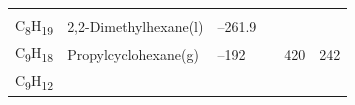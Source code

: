 \documentclass[
  9pt,
]{extbook}
\theoremstyle{definition}
\theoremstyle{definition}
\theoremstyle{definition}
\theoremstyle{remark}
\begin{document}
\begin{longtable}[]{@{}llllll@{}}
\begin{minipage}[t]{0.15\columnwidth}
\strut
\end{minipage} & \begin{minipage}[t]{0.14\columnwidth}\raggedright
\strut
\end{minipage} & \begin{minipage}[t]{0.14\columnwidth}\raggedright
\strut
\end{minipage}\tabularnewline
\begin{minipage}[t]{0.07\columnwidth}\raggedright
C\textsubscript{8}H\textsubscript{19}\strut
\end{minipage} & \begin{minipage}[t]{0.17\columnwidth}\raggedright
2,2-Dimethylhexane(l)\strut
\end{minipage} & \begin{minipage}[t]{0.15\columnwidth}\raggedright
--261.9\strut
\end{minipage} & \begin{minipage}[t]{0.15\columnwidth}\raggedright
\strut
\end{minipage} & \begin{minipage}[t]{0.14\columnwidth}\raggedright
\strut
\end{minipage} & \begin{minipage}[t]{0.14\columnwidth}\raggedright
\strut
\end{minipage}\tabularnewline
\begin{minipage}[t]{0.07\columnwidth}\raggedright
C\textsubscript{9}H\textsubscript{18}\strut
\end{minipage} & \begin{minipage}[t]{0.17\columnwidth}\raggedright
Propylcyclohexane(g)\strut
\end{minipage} & \begin{minipage}[t]{0.15\columnwidth}\raggedright
--192\strut
\end{minipage} & \begin{minipage}[t]{0.15\columnwidth}\raggedright
\strut
\end{minipage} & \begin{minipage}[t]{0.14\columnwidth}\raggedright
420\strut
\end{minipage} & \begin{minipage}[t]{0.14\columnwidth}\raggedright
242\strut
\end{minipage}\tabularnewline
\begin{minipage}[t]{0.07\columnwidth}\raggedright
C\textsubscript{9}H\textsubscript{12}\strut
\end{minipage} & \begin{minipage}[t]{0.17\columnwidth}\raggedright

\end{minipage}
\end{longtable}
\end{document}

